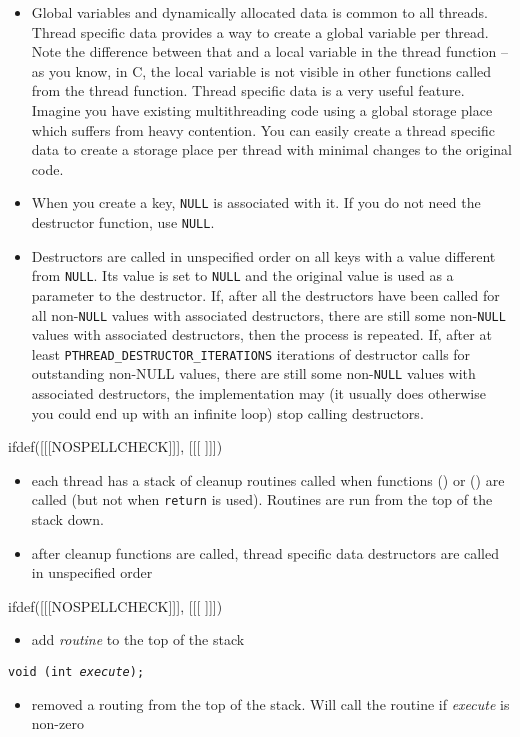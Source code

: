 \begin{itemize}
\item \label{THREAD_SPECIFIC_DATA} Global variables and dynamically
allocated data is common to all threads.  Thread specific data provides a way to
create a global variable per thread.  Note the difference between that and a
local variable in the thread function -- as you know, in C, the local variable
is not visible in other functions called from the thread function.  Thread
specific data is a very useful feature.  Imagine you have existing
multithreading code using a global storage place which suffers from heavy
contention.  You can easily create a thread specific data to create a storage
place per thread with minimal changes to the original code.
\item When you create a key, \texttt{NULL} is associated with it.  If you do not
need the destructor function, use \texttt{NULL}.
\item Destructors are called in unspecified order on all keys with a value
different from \texttt{NULL}.  Its value is set to \texttt{NULL} and the
original value is used as a parameter to the destructor.  If, after all the
destructors have been called for all non-\texttt{NULL} values with associated
destructors, there are still some non-\texttt{NULL} values with associated
destructors, then the process is repeated.  If, after at least
\texttt{PTHREAD\_DESTRUCTOR\_ITERATIONS} iterations of destructor calls for
outstanding non-NULL values, there are still some non-\texttt{NULL} values with
associated destructors, the implementation may (it usually does otherwise you
could end up with an infinite loop) stop calling destructors.
\end{itemize}


ifdef([[[NOSPELLCHECK]]], [[[
]]])

\begin{slide}
\begin{itemize}
\item each thread has a stack of cleanup routines called when functions
() or () are called (but not when
\texttt{return} is used).  Routines are run from the top of the stack down.
\item after cleanup functions are called, thread specific data destructors are
called in unspecified order
\end{itemize}
ifdef([[[NOSPELLCHECK]]], [[[
]]])
\begin{itemize}
\item add \emph{routine} to the top of the stack
\end{itemize}
\texttt{void (int \emph{execute});}
\begin{itemize}
\item removed a routing from the top of the stack.  Will call the routine if
\emph{execute} is non-zero
\end{itemize}
\end{slide}

